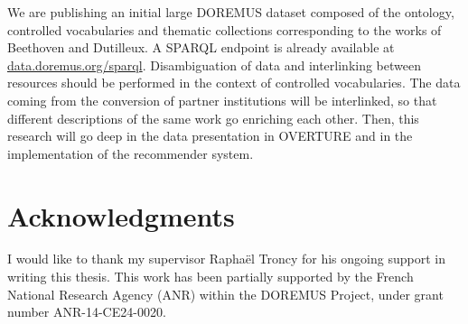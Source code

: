 \documentclass{llncs}
\begin{document}
We are publishing an initial large DOREMUS dataset composed of the ontology, controlled vocabularies and thematic collections corresponding to the works of Beethoven and Dutilleux. A SPARQL endpoint is already available at \url{data.doremus.org/sparql}. Disambiguation of data and interlinking between resources should be performed in the context of controlled vocabularies. The data coming from the conversion of partner institutions will be interlinked, so that different descriptions of the same work go enriching each other. Then, this research will go deep in the data presentation in OVERTURE and in the implementation of the recommender system.

\section*{Acknowledgments}
I would like to thank my supervisor Rapha\"el Troncy for his ongoing support in writing this thesis. This work has been partially supported by the French National Research Agency (ANR) within the DOREMUS Project, under grant number ANR-14-CE24-0020.



\end{document}
